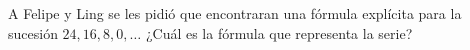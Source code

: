 A Felipe y Ling se les pidió que encontraran una fórmula explícita para la sucesión $24,16,8,0, \dots$
¿Cu\'al es la f\'ormula que representa la serie? \fillin[$24-8(n-1)$]
